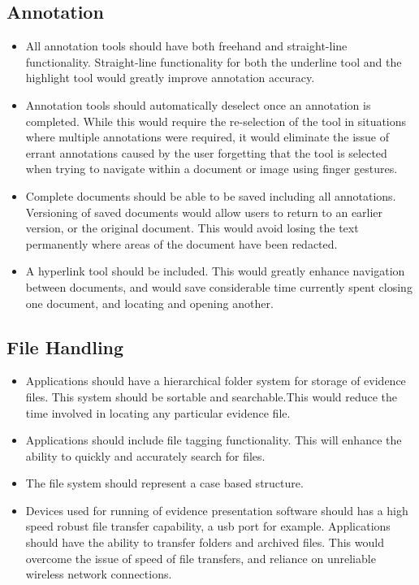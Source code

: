\subsection{Annotation}
\begin{itemize}
    \item All annotation tools should have both freehand and straight-line functionality. Straight-line functionality for both the underline tool and the highlight tool would greatly improve annotation accuracy.
    \item Annotation tools should automatically deselect once an annotation is completed. While this would require the re-selection of the tool in situations where multiple annotations were required, it would eliminate the issue of errant annotations caused by the user forgetting that the tool is selected when trying to navigate within a document or image using finger gestures.
    \item Complete documents should be able to be saved including all annotations. Versioning of saved documents would allow users to return to an earlier version, or the original document. This would avoid losing the text permanently where areas of the document have been redacted.
    \item A hyperlink tool should be included. This would greatly enhance navigation between documents, and would save considerable time currently spent closing one document, and locating and opening another.
\end{itemize}
\subsection{File Handling}
\begin{itemize}
    \item Applications should have a hierarchical folder system for storage of evidence files. This system should be sortable and searchable.This would reduce the time involved in locating any particular evidence file.
    \item Applications should include file tagging functionality. This will enhance the ability to quickly and accurately search for files.
    \item The file system should represent a case based structure.
    \item Devices used for running of evidence presentation software should has a high speed robust file transfer capability, a usb port for example. Applications should have the ability to transfer folders and archived files. This would overcome the issue of speed of file transfers, and reliance on unreliable wireless network connections.
\end{itemize}

